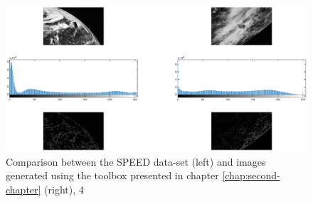 \begin{figure}[htbp]
  \centering
  \includegraphics[width=1.0\textwidth]{gfx/comparison/comparison4.eps}
  \caption{Comparison between the SPEED data-set (left) and images generated using the toolbox presented in chapter \ref{chap:second-chapter} (right), 4}
  \label{fig:comparison4}
\end{figure}

